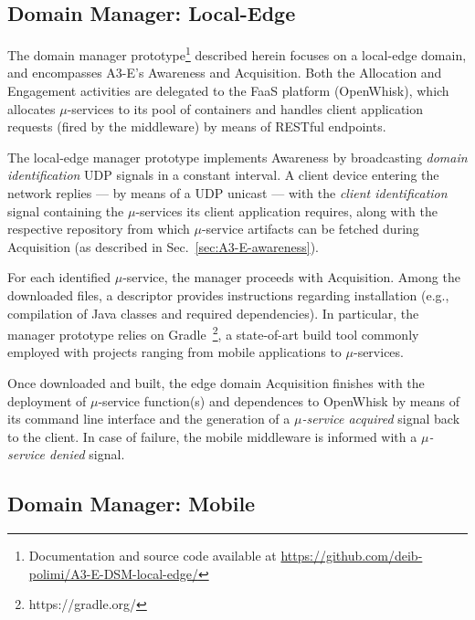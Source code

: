 \subsection{Domain Manager: Local-Edge}\label{sec:local-edge-domain-DSM}


The domain manager prototype\footnote{Documentation and source code available at \url{https://github.com/deib-polimi/A3-E-DSM-local-edge/}} described herein focuses on a local-edge domain, and encompasses A3-E's Awareness and Acquisition. Both the Allocation and Engagement activities are delegated to the FaaS platform (OpenWhisk), which allocates $\mu$-services to its pool of containers and handles client application requests (fired by the middleware) by means of RESTful endpoints.

The local-edge manager prototype implements Awareness by broadcasting \textit{domain identification} UDP signals in a constant interval. A client device entering the network replies --- by means of a UDP unicast --- with the \textit{client identification} signal containing the $\mu$-services its client application requires, along with the respective repository from which $\mu$-service artifacts can be fetched during Acquisition (as described in Sec.~\ref{sec:A3-E-awareness}). 

For each identified $\mu$-service, the manager proceeds with Acquisition. Among the downloaded files, a descriptor provides instructions regarding installation (e.g., compilation of Java classes and required dependencies). In particular, the manager prototype relies on Gradle~\footnote{https://gradle.org/}, a state-of-art build tool commonly employed with projects ranging from mobile applications to $\mu$-services.

Once downloaded and built, the edge domain Acquisition finishes with the deployment of $\mu$-service function(s) and dependences to OpenWhisk by means of its command line interface and the generation of a \textit{$\mu$-service acquired} signal back to the client. In case of failure, the mobile middleware is informed with a \textit{$\mu$-service denied} signal.

\subsection{Domain Manager: Mobile}\label{sec:mobile-domain-DSM}

